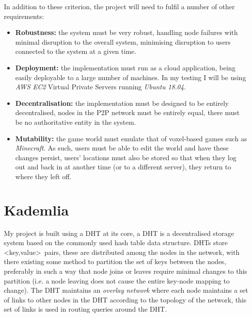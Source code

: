 \documentclass[10pt,twoside,notitlepage,a4paper]{report}
\begin{document}
	In addition to these criterion, the project will need to fulfil a number of other requirements:
	
	\begin{itemize}
		\item \textbf{Robustness:} the system must be very robust, handling node failures with minimal disruption to the overall system, minimising disruption to users connected to the system at a given time.
		\item \textbf{Deployment:} the implementation must run as a cloud application, being easily deployable to a large number of machines. In my testing I will be using \emph{AWS EC2} Virtual Private Servers running \emph{Ubuntu 18.04}.
		\item \textbf{Decentralisation:} the implementation must be designed to be entirely decentralised, nodes in the P2P network must be entirely equal, there must be no authoritative entity in the system.
		\item \textbf{Mutability:} the game world must emulate that of voxel-based games such as \emph{Minecraft}. As such, users must be able to edit the world and have these changes persist, users' locations must also be stored so that when they log out and back in at another time (or to a different server), they return to where they left off.
	\end{itemize}

	\section{Kademlia}
	My project is built using a DHT at its core, a DHT is a decentralised storage system based on the commonly used hash table data structure. DHTs store \textless key,value\textgreater~pairs, these are distributed among the nodes in the network, with there existing some method to partition the set of keys between the nodes, preferably in such a way that node joins or leaves require minimal changes to this partition (i.e. a node leaving does not cause the entire key-node mapping to change). The DHT maintains an \emph{overlay network} where each node maintains a set of links to other nodes in the DHT according to the topology of the network, this set of links is used in routing queries around the DHT.
	
\end{document}
